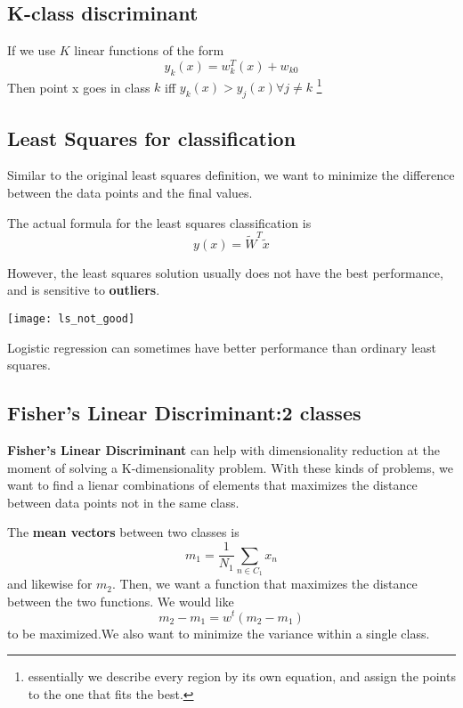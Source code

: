 \documentclass{tufte-handout}
\begin{document}
\subsection{K-class discriminant}
	If we use $K$ linear functions of the form 
	\[ y_{k}(x) = w^{T}_{k}(x) + w_{k0}\]
	Then point x goes in class $k$ iff $y_{k}(x) > y_{j}(x) \forall j\neq k$ 
	\footnote{essentially we describe every region by its own equation, and assign
		the points to the one that fits the best.}
\subsection{Least Squares for classification}
	Similar to the original least squares definition, we want to minimize the difference
	between the data points and the final values. 

	The actual formula for the least squares classification is
	\[ y(x) = \widetilde{W}^{T}\tilde{x}\]

	However, the least squares solution usually does not have the best performance, and is 
	sensitive to \textbf{outliers}.
	\begin{marginfigure}
			\texttt{[image: ls\_not\_good]}
			\caption{Logistic regression can sometimes have better performance than
				ordinary least squares.}
	\end{marginfigure}
\subsection{Fisher's Linear Discriminant:2 classes}
	\textbf{Fisher's Linear Discriminant} can help with dimensionality reduction at the moment
	of solving a K-dimensionality problem. With these kinds of problems, we want to find a lienar
	combinations of elements that maximizes the distance between data points not in the same class.

	The \textbf{mean vectors} between two classes is 
	\[ m_{1} = \frac{1}{N_{1}} \sum_{n\in C_{1}}^{}x_{n}\]
	and likewise for $m_{2}$. Then, we want a function that maximizes the distance between the two
	functions. We would like  
	\[ m_{2} - m_{1} = w^{t}(m_{2} - m_{1})\]
	to be maximized.We also want to minimize the variance within a single class.
\end{document}
